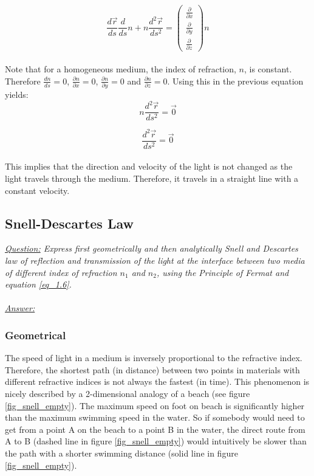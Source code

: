 \documentclass{article}
\def\Nabla{
	\begin{pmatrix}
		\frac{\partial}{\partial {x}} \\
		\frac{\partial}{\partial {y}} \\
		\frac{\partial}{\partial {z}}
	\end{pmatrix}}
\begin{document}
\begin{equation*}
	\frac{d \vec{r}}{ds} \frac{d}{ds} n + n \frac{d^2 \vec{r}}{ds^2} = \Nabla n
\end{equation*} \\

Note that for a homogeneous medium, the index of refraction, $n$, is constant. Therefore $\frac{dn}{ds} = 0$, $\frac{\partial n}{\partial x} = 0$, $\frac{\partial n}{\partial y} = 0$ and $\frac{\partial n}{\partial z} = 0$. Using this in the previous equation yields: \\

\begin{equation*}
	 n \frac{d^2 \vec{r}}{ds^2} = \vec{0}
\end{equation*}

\begin{equation*}
	 \frac{d^2 \vec{r}}{ds^2} = \vec{0}
\end{equation*} \\


This implies that the direction and velocity of the light is not changed as the light travels through the medium. Therefore, it travels in a straight line with a constant velocity.\\

\newpage
\subsection{Snell-Descartes Law}

\textit{\underline{Question:} Express first geometrically and then analytically Snell and Descartes law of reflection and transmission of the light at the interface between two media of different index of refraction $n_1$ and $n_2$, using the Principle of Fermat and equation \ref{eq_1.6}.}\\
\\
\textit{\underline{Answer:}} \\
\subsubsection{Geometrical}
The speed of light in a medium is inversely proportional to the refractive index. Therefore, the shortest path (in distance) between two points in materials with different refractive indices is not always the fastest (in time). This phenomenon is nicely described by a 2-dimensional analogy of a beach (see figure \ref{fig_snell_empty}). The maximum speed on foot on beach is significantly higher than the maximum swimming speed in the water. So if somebody would need to get from a point A on the beach to a point B in the water, the direct route from A to B (dashed line in figure \ref{fig_snell_empty}) would intuitively be slower than the path with a shorter swimming distance (solid line in figure \ref{fig_snell_empty}).
\end{document}
